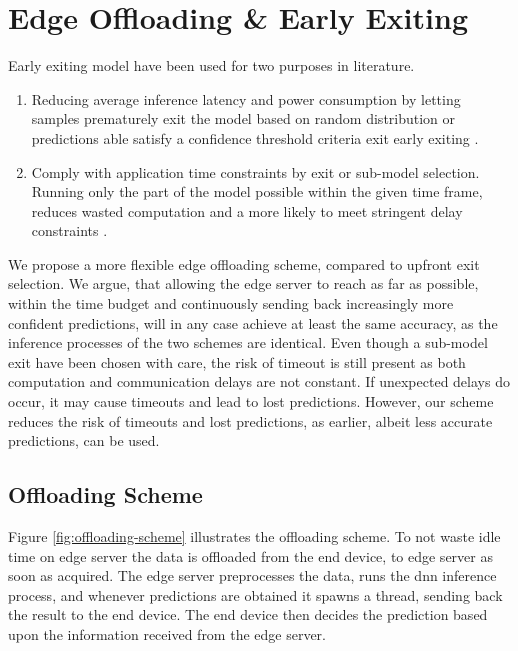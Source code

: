 \chapter{Edge Offloading \& Early Exiting}

Early exiting model have been used for two purposes in literature.

\begin{enumerate}
	\item Reducing average inference latency and power consumption by letting samples prematurely exit the model based on random distribution \cite{bibid} or predictions able satisfy a confidence threshold criteria exit early exiting \cite{teerapittayanon_branchynet:_2016}.
	\item Comply with application time constraints by exit or sub-model selection. Running only the part of the model possible within the given time frame, reduces wasted computation and a more likely to meet stringent delay constraints  \cite{li_edge_2018}. 
\end{enumerate} 

We propose a more flexible edge offloading scheme, compared to upfront exit selection. We argue, that allowing the edge server to reach as far as possible, within the time budget and continuously sending back increasingly more confident predictions, will in any case achieve at least the same accuracy, as the inference processes of the two schemes are identical. Even though a sub-model exit have been chosen with care, the risk of timeout is still present as both computation and communication delays are not constant. If unexpected delays do occur, it may cause timeouts and lead to lost predictions. However, our scheme reduces the risk of timeouts and lost predictions, as earlier, albeit less accurate predictions, can be used. 

\section{Offloading Scheme}

Figure \ref{fig:offloading-scheme} illustrates the offloading scheme. To not waste idle time on edge server the data is offloaded from the end device, to edge server as soon as acquired. The edge server preprocesses the data, runs the \gls{dnn} inference process, and whenever predictions are obtained it spawns a thread, sending back the result to the end device. The end device then decides the prediction based upon the information received from the edge server.  

